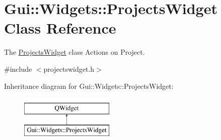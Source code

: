 \hypertarget{classGui_1_1Widgets_1_1ProjectsWidget}{\section{Gui\-:\-:Widgets\-:\-:Projects\-Widget Class Reference}
\label{classGui_1_1Widgets_1_1ProjectsWidget}
}


The \hyperlink{classGui_1_1Widgets_1_1ProjectsWidget}{Projects\-Widget} class Actions on Project.  




{\ttfamily \#include $<$projectswidget.\-h$>$}

Inheritance diagram for Gui\-:\-:Widgets\-:\-:Projects\-Widget\-:\begin{figure}[H]
\begin{center}
\leavevmode
\includegraphics[height=2.000000cm]{dc/d8c/classGui_1_1Widgets_1_1ProjectsWidget}
\end{center}
\end{figure}
